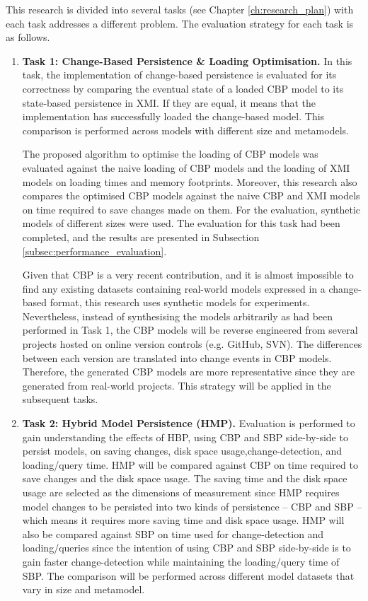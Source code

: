 \documentclass[12pt, a4paper]{report} \usepackage[titletoc]{appendix}
\begin{document}
This research is divided into several tasks (see Chapter \ref{ch:research_plan}) with each task addresses a different problem. The evaluation strategy for each task is as follows. 
\begin{enumerate}
    \item \textbf{Task 1: Change-Based Persistence \& Loading Optimisation.} In this task, the implementation of change-based persistence is evaluated for its correctness by comparing the eventual state of a loaded CBP model to its state-based persistence in XMI. If they are equal, it means that the implementation has successfully loaded the change-based model. This comparison is performed across models with different size and metamodels.    
    
    The proposed algorithm to optimise the loading of CBP models was evaluated against the naive loading of CBP models and the loading of XMI models on loading times and memory footprints. Moreover, this research also compares the optimised CBP models against the naive CBP and XMI models on time required to save changes made on them. For the evaluation, synthetic models of different sizes were used. The evaluation for this task had been completed, and the results are presented in Subsection \ref{subsec:performance_evaluation}.
    
    Given that CBP is a very recent contribution, and it is almost impossible to find any existing datasets containing real-world models expressed in a change-based format, this research uses synthetic models for experiments. Nevertheless, instead of synthesising the models arbitrarily as had been performed in Task 1, the CBP models will be reverse engineered from several projects hosted on online version controls (e.g. GitHub, SVN). The differences between each version are translated into change events in CBP models. Therefore, the generated CBP models are more representative since they are generated from real-world projects. This strategy will be applied in the subsequent tasks.
    
    \item \textbf{Task 2: Hybrid Model Persistence (HMP).} Evaluation is performed to gain understanding the effects of HBP, using CBP and SBP side-by-side to persist models, on saving changes, disk space usage,change-detection, and loading/query time. HMP will be compared against CBP on time required to save changes and the disk space usage. The saving time and the disk space usage are selected as the dimensions of measurement since HMP requires model changes to be persisted into two kinds of persistence -- CBP and SBP -- which means it requires more saving time and disk space usage. HMP will also be compared against SBP on time used for change-detection and loading/queries since the intention of using CBP and SBP side-by-side is to gain faster change-detection while maintaining the loading/query time of SBP. The comparison will be performed across different model datasets that vary in size and metamodel.
    

\end{enumerate}
\end{document}
